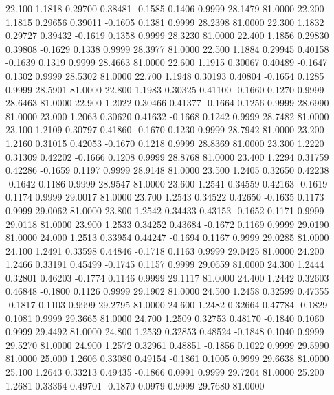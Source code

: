   22.100   1.1818   0.29700   0.38481  -0.1585   0.1406   0.9999  28.1479  81.0000
  22.200   1.1815   0.29656   0.39011  -0.1605   0.1381   0.9999  28.2398  81.0000
  22.300   1.1832   0.29727   0.39432  -0.1619   0.1358   0.9999  28.3230  81.0000
  22.400   1.1856   0.29830   0.39808  -0.1629   0.1338   0.9999  28.3977  81.0000
  22.500   1.1884   0.29945   0.40158  -0.1639   0.1319   0.9999  28.4663  81.0000
  22.600   1.1915   0.30067   0.40489  -0.1647   0.1302   0.9999  28.5302  81.0000
  22.700   1.1948   0.30193   0.40804  -0.1654   0.1285   0.9999  28.5901  81.0000
  22.800   1.1983   0.30325   0.41100  -0.1660   0.1270   0.9999  28.6463  81.0000
  22.900   1.2022   0.30466   0.41377  -0.1664   0.1256   0.9999  28.6990  81.0000
  23.000   1.2063   0.30620   0.41632  -0.1668   0.1242   0.9999  28.7482  81.0000
  23.100   1.2109   0.30797   0.41860  -0.1670   0.1230   0.9999  28.7942  81.0000
  23.200   1.2160   0.31015   0.42053  -0.1670   0.1218   0.9999  28.8369  81.0000
  23.300   1.2220   0.31309   0.42202  -0.1666   0.1208   0.9999  28.8768  81.0000
  23.400   1.2294   0.31759   0.42286  -0.1659   0.1197   0.9999  28.9148  81.0000
  23.500   1.2405   0.32650   0.42238  -0.1642   0.1186   0.9999  28.9547  81.0000
  23.600   1.2541   0.34559   0.42163  -0.1619   0.1174   0.9999  29.0017  81.0000
  23.700   1.2543   0.34522   0.42650  -0.1635   0.1173   0.9999  29.0062  81.0000
  23.800   1.2542   0.34433   0.43153  -0.1652   0.1171   0.9999  29.0118  81.0000
  23.900   1.2533   0.34252   0.43684  -0.1672   0.1169   0.9999  29.0190  81.0000
  24.000   1.2513   0.33954   0.44247  -0.1694   0.1167   0.9999  29.0285  81.0000
  24.100   1.2491   0.33598   0.44846  -0.1718   0.1163   0.9999  29.0425  81.0000
  24.200   1.2466   0.33191   0.45499  -0.1745   0.1157   0.9999  29.0659  81.0000
  24.300   1.2444   0.32801   0.46203  -0.1774   0.1146   0.9999  29.1117  81.0000
  24.400   1.2442   0.32603   0.46848  -0.1800   0.1126   0.9999  29.1902  81.0000
  24.500   1.2458   0.32599   0.47355  -0.1817   0.1103   0.9999  29.2795  81.0000
  24.600   1.2482   0.32664   0.47784  -0.1829   0.1081   0.9999  29.3665  81.0000
  24.700   1.2509   0.32753   0.48170  -0.1840   0.1060   0.9999  29.4492  81.0000
  24.800   1.2539   0.32853   0.48524  -0.1848   0.1040   0.9999  29.5270  81.0000
  24.900   1.2572   0.32961   0.48851  -0.1856   0.1022   0.9999  29.5990  81.0000
  25.000   1.2606   0.33080   0.49154  -0.1861   0.1005   0.9999  29.6638  81.0000
  25.100   1.2643   0.33213   0.49435  -0.1866   0.0991   0.9999  29.7204  81.0000
  25.200   1.2681   0.33364   0.49701  -0.1870   0.0979   0.9999  29.7680  81.0000
